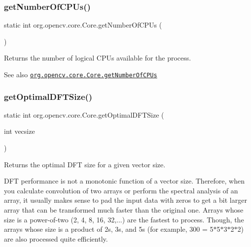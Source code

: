 \subsubsection{\texorpdfstring{get\+Number\+Of\+C\+P\+Us()}{getNumberOfCPUs()}}
{\footnotesize\ttfamily static int org.\+opencv.\+core.\+Core.\+get\+Number\+Of\+C\+P\+Us (\begin{DoxyParamCaption}{ }\end{DoxyParamCaption})\hspace{0.3cm}{\ttfamily [static]}}

Returns the number of logical C\+P\+Us available for the process.

\begin{DoxySeeAlso}{See also}
\href{http://docs.opencv.org/modules/core/doc/utility_and_system_functions_and_macros.html#getnumberofcpus}{\tt org.\+opencv.\+core.\+Core.\+get\+Number\+Of\+C\+P\+Us} 
\end{DoxySeeAlso}
\mbox{\label{classorg_1_1opencv_1_1core_1_1_core_a9818ffe89dca479da8352d5bf6ebd6b3}} 
\subsubsection{\texorpdfstring{get\+Optimal\+D\+F\+T\+Size()}{getOptimalDFTSize()}}
{\footnotesize\ttfamily static int org.\+opencv.\+core.\+Core.\+get\+Optimal\+D\+F\+T\+Size (\begin{DoxyParamCaption}\item[{int}]{vecsize }\end{DoxyParamCaption})\hspace{0.3cm}{\ttfamily [static]}}

Returns the optimal D\+FT size for a given vector size.

D\+FT performance is not a monotonic function of a vector size. Therefore, when you calculate convolution of two arrays or perform the spectral analysis of an array, it usually makes sense to pad the input data with zeros to get a bit larger array that can be transformed much faster than the original one. Arrays whose size is a power-\/of-\/two (2, 4, 8, 16, 32,...) are the fastest to process. Though, the arrays whose size is a product of 2\textquotesingle{}s, 3\textquotesingle{}s, and 5\textquotesingle{}s (for example, 300 = 5$\ast$5$\ast$3$\ast$2$\ast$2) are also processed quite efficiently.

